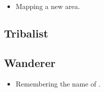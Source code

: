 \begin{multicols}{2}
\begin{itemize}

  \item
  Mapping a new area.

\end{itemize}

\subsection{Tribalist}

\subsection{Wanderer}

\begin{itemize}

  \item
  Remembering the name of .

\end{itemize}

\end{multicols}
